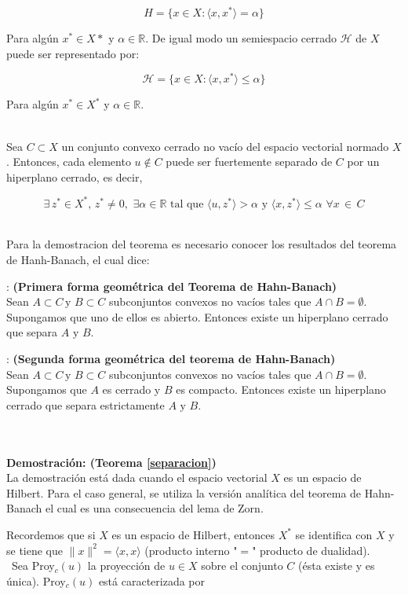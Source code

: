 $$H= \{ x \in X: \langle x, x^* \rangle = \alpha \}$$

Para alg\'un $x^* \in X*$ y $\alpha \in \mathbb{R}$. De igual modo un semiespacio cerrado $\mathcal{H}$ de $X$ puede ser representado por:

$$\mathcal{H} = \{x \in X: \langle x, x^*\rangle \leqslant \alpha \}$$

Para alg\'un $x^* \in X^*$ y $\alpha \in \mathbb{R}$.\\ \\


{\teorema Sea $C \subset X$ un conjunto convexo cerrado no vac\'io del espacio vectorial normado $X$.
Entonces, cada elemento $ u \notin C$ puede ser fuertemente separado de $C$ por un hiperplano 
cerrado, es decir,

$$\exists \, z^* \in X^*, \, z^* \neq 0,\,\, \exists \alpha \in \mathbb{R}\,\, \mbox{tal que} \,\,
\langle u, z^* \rangle > \alpha \,\, \mbox{y}\,\, \langle x, z^* \rangle \leqslant \alpha \,\, 
\forall  x \,\in \, C$$
\label{separacion} }\\ 

Para la demostracion del teorema es necesario conocer los resultados del teorema de Hanh-Banach, el 
cual dice:

{\teorema: {\bf(Primera forma geom\'etrica del Teorema de Hahn-Banach)} \\
Sean $A \subset C \, \mbox{y} \,\, B\subset C$ subconjuntos convexos no vac\'ios tales que $A \cap B = 
\emptyset.$ Supongamos que uno de ellos es abierto. Entonces existe un hiperplano cerrado que separa
$A \,\, \mbox{y} \,\, B.$ \label{hb1}}

{\teorema: {\bf(Segunda forma geom\'etrica del teorema de Hahn-Banach)}\\
Sean $A \subset C \, \mbox{y} \,\, B\subset C$ subconjuntos convexos no vac\'ios tales que $A \cap B = 
\emptyset.$ Supongamos que $A$ es cerrado y $B$ es compacto. Entonces existe un hiperplano cerrado
que separa estrictamente $A \,\, \mbox{y} \,\, B.$  \label{hb2} }\\ \\
\

\textbf{Demostraci\'on: (Teorema \ref{separacion})}\\
La demostraci\'on est\'a dada cuando el espacio vectorial $X$ es un espacio de Hilbert. Para 
el caso general, se utiliza la versi\'on anal\'itica del teorema de Hahn-Banach el cual es una 
consecuencia del lema de Zorn.
\medskip

Recordemos que si $X$ es un espacio de Hilbert, entonces $X^*$ se identifica con $X$ y se tiene que
$\parallel x \parallel^2 = \langle x, x \rangle$ (producto interno "$=$" producto de dualidad).\\ 
\ 
Sea Proy$_c (u)$ la proyecci\'on de $u \in X$ sobre el conjunto $C$ (\'esta existe y es \'unica). 
Proy$_c (u)$ est\'a caracterizada por 


